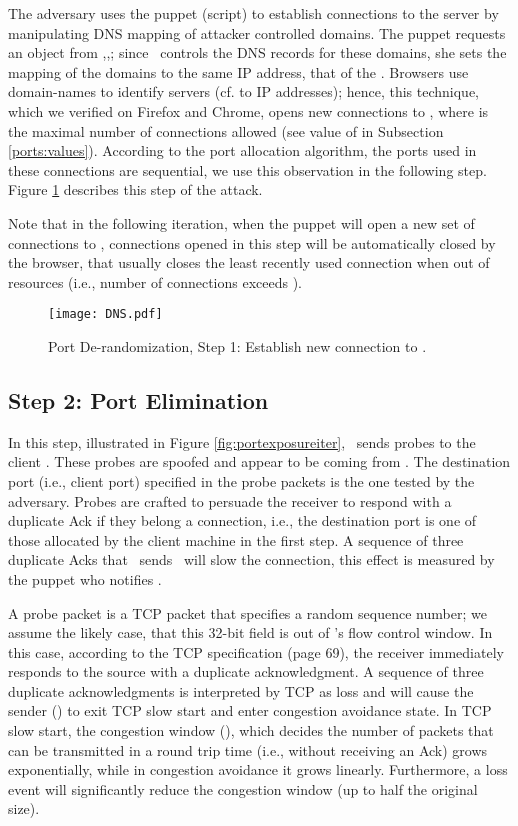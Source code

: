 \documentclass[conference]{IEEEtran}
\newcommand{\cwnd}{}
\newcommand{\malcomn}{\mbox{}}
\begin{document}
The adversary uses the puppet (script) to establish  connections to the server by manipulating DNS mapping of attacker controlled domains. The puppet requests an object from \malcoma,,\malcomn; since \mal\ controls the DNS records for these domains, she sets the mapping of the domains to the same IP address, that of the \lin. Browsers use domain-names to identify servers (cf. to IP addresses); hence, this technique, which we verified on Firefox and Chrome, opens  new connections to \lin, where  is the maximal number of connections allowed (see value of  in Subsection \ref{ports:values}). According to the port allocation algorithm, the ports used in these connections are sequential, we use this observation in the following step. Figure \ref{fig:openconn} describes this step of the attack.

Note that in the following iteration, when the puppet will open a new set of  connections to \lin, connections opened in this step will be automatically closed by the browser, that usually closes the least recently used connection when out of resources (i.e., number of connections exceeds ).


\begin{figure}
  \begin{center}
    \texttt{[image: DNS.pdf]}
  \end{center}
  \caption{Port De-randomization, Step 1: Establish new connection to \lin.}
    \label{fig:openconn}
\end{figure}



\subsection{Step 2: Port Elimination}

In this step, illustrated in Figure \ref{fig:portexposureiter}, \mal\ sends probes to the client \wini. These probes are spoofed and appear to be coming from \lin. The destination port (i.e., client port) specified in the probe packets is the one tested by the adversary. Probes are crafted to persuade the receiver to respond with a duplicate Ack if they belong a connection, i.e., the destination port is one of those allocated by the client machine in the first step. A sequence of three duplicate Acks that \wini\ sends \lin\ will slow the connection, this effect is measured by the puppet who notifies \mal.

A probe packet is a TCP packet that specifies a random sequence number; we assume the likely case, that this 32-bit field is out of \wini's flow control window. In this case, according to the TCP specification \cite{rfc793} (page 69), the receiver immediately responds to the source with a duplicate acknowledgment. A sequence of three duplicate acknowledgments is interpreted by TCP as loss and will cause the sender (\lin) to exit TCP slow start and enter congestion avoidance state. In TCP slow start, the congestion window (\cwnd), which decides the number of packets that can be transmitted in a round trip time (i.e., without receiving an Ack) grows exponentially, while in congestion avoidance it grows linearly. Furthermore, a loss event will significantly reduce the congestion window (up to half the original size).
\end{document}
